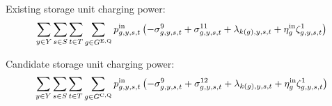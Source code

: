 \documentclass{article}
\begin{document}
Existing storage unit charging power:
\begin{align}
	& \sum\limits_{\iYear \in \sYears} \sum\limits_{\iScenario \in \sScenarios} \sum\limits_{\iInterval \in \sIntervals 
	} \sum\limits_{\iGenerator \in \sStorageExisting} \vPowerIn \left( - \dNonNegativeCharging + \dMaxChargingRateExisting + \dPowerBalance[k(\iGenerator),\iYear,\iScenario,\iInterval] + \cStorageUnitEfficiencyCharging\dStorageEnergyTransition 
	 \right) \nonumber\\
\end{align}

Candidate storage unit charging power:
\begin{align}
	& \sum\limits_{\iYear \in \sYears} \sum\limits_{\iScenario \in \sScenarios} \sum\limits_{\iInterval \in \sIntervals 
	} \sum\limits_{\iGenerator \in \sStorageCandidate} \vPowerIn \left( - \dNonNegativeCharging + \dMaxChargingRateCandidate + \dPowerBalance[k(\iGenerator),\iYear,\iScenario,\iInterval] + \cStorageUnitEfficiencyCharging\dStorageEnergyTransition
	\right)\nonumber\\
\end{align}
\end{document}
